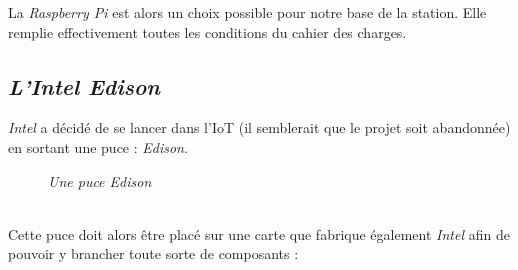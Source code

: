 La \textit{Raspberry Pi} est alors un choix possible pour notre base de la station. Elle remplie effectivement toutes les conditions du cahier des charges.

\subsection{\textit{L'Intel Edison}}

\textit{Intel} a décidé de se lancer dans l'IoT (il semblerait que le projet soit abandonnée) en sortant une puce : \textit{Edison}.
\begin{figure}[H]
\begin{center}
\end{center}
		\caption{ \textit{Une puce Edison}}
\end{figure}\\

Cette puce doit alors être placé sur une carte que fabrique également \textit{Intel} afin de pouvoir y brancher toute sorte de composants :\\

